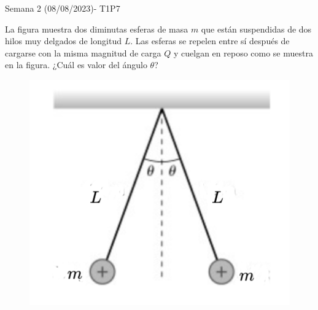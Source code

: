 \begin{frame}{Semana 2 (08/08/2023)- T1P7}
    
    La figura muestra dos diminutas esferas de masa $m$ que est\'an suspendidas de dos hilos muy delgados de longitud $L$. Las esferas se repelen entre sí después de cargarse con la misma magnitud de carga $Q$ y cuelgan en reposo como se muestra en la figura. ¿Cuál es valor del ángulo $\theta$?
    
    \begin{figure}
        \centering
        \includegraphics[scale=0.4]{figures/Q1.png}
    \end{figure}
    
\end{frame}

